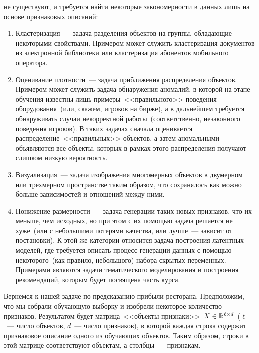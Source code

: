 \documentclass[12pt,fleqn]{article}
\begin{document}
не существуют, и требуется найти некоторые закономерности в данных лишь
на основе признаковых описаний:
\begin{enumerate}
    \item Кластеризация~--- задача разделения объектов на группы, обладающие
        некоторыми свойствами. Примером может служить кластеризация документов из
        электронной библиотеки или кластеризация абонентов мобильного оператора.
    \item Оценивание плотности~--- задача приближения распределения объектов.
        Примером может служить задача обнаружения аномалий, в которой
        на этапе обучения известны лишь примеры~<<правильного>> поведения оборудования~(или, скажем,
        игроков на бирже), а в дальнейшем требуется обнаруживать случаи
        некорректной работы~(соответственно, незаконного поведения игроков).
        В таких задачах сначала оценивается распределение~<<правильных>> объектов,
        а затем аномальными объявляются все объекты, которых в рамках этого
        распределения получают слишком низкую вероятность.
    \item Визуализация~--- задача изображения многомерных объектов
        в двумерном или трехмерном пространстве таким образом,
        что сохранялось как можно больше зависимостей и отношений между ними.
    \item Понижение размерности~--- задача генерации таких новых признаков,
        что их меньше, чем исходных, но при этом с их помощью задача решается не хуже~(или с небольшими
        потерями качества, или лучше~--- зависит от постановки).
        К этой же категории относится задача построения латентных моделей, где требуется описать
        процесс генерации данных с помощью некоторого~(как правило, небольшого) набора скрытых
        переменных.
        Примерами являются задачи тематического моделирования и построения рекомендаций,
        которым будет посвящена часть курса.
\end{enumerate}

Вернемся к нашей задаче по предсказанию прибыли ресторана.
Предположим, что мы собрали обучающую выборку и изобрели некоторое количество признаков.
Результатом будет матрица~<<объекты-признаки>>~$X \in \RR^{\ell \times d}$~($\ell$~---
число объектов, $d$~--- число признаков), в которой каждая строка
содержит признаковое описание одного из обучающих объектов.
Таким образом, строки в этой матрице соответствуют объектам, а столбцы~--- признакам.
\end{document}
